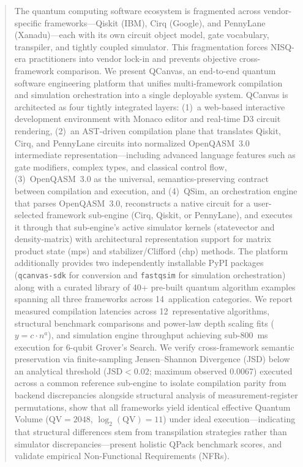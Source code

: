 \documentclass[runningheads]{llncs}
\begin{document}
\begin{abstract}
The quantum computing software ecosystem is fragmented across vendor-specific frameworks---Qiskit (IBM), Cirq (Google), and PennyLane (Xanadu)---each with its own circuit object model, gate vocabulary, transpiler, and tightly coupled simulator. This fragmentation forces NISQ-era practitioners into vendor lock-in and prevents objective cross-framework comparison. We present QCanvas, an end-to-end quantum software engineering platform that unifies multi-framework compilation and simulation orchestration into a single deployable system. QCanvas is architected as four tightly integrated layers: (1)~a web-based interactive development environment with Monaco editor and real-time D3 circuit rendering, (2)~an AST-driven compilation plane that translates Qiskit, Cirq, and PennyLane circuits into normalized OpenQASM~3.0 intermediate representation---including advanced language features such as gate modifiers, complex types, and classical control flow, (3)~OpenQASM~3.0 as the universal, semantics-preserving contract between compilation and execution, and (4)~QSim, an orchestration engine that parses OpenQASM~3.0, reconstructs a native circuit for a user-selected framework sub-engine (Cirq, Qiskit, or PennyLane), and executes it through that sub-engine's active simulator kernels (statevector and density-matrix) with architectural representation support for matrix product state (mps) and stabilizer/Clifford (chp) methods. The platform additionally provides two independently installable PyPI packages (\texttt{qcanvas-sdk} for conversion and \texttt{fastqsim} for simulation orchestration) along with a curated library of 40+ pre-built quantum algorithm examples spanning all three frameworks across 14~application categories. We report measured compilation latencies across 12~representative algorithms, structural benchmark comparisons and power-law depth scaling fits ($y = c \cdot n^a$), and simulation engine throughput achieving sub-800~ms execution for 6-qubit Grover's Search. We verify cross-framework semantic preservation via finite-sampling Jensen--Shannon Divergence (JSD) below an analytical threshold ($\text{JSD} < 0.02$; maximum observed 0.0067) executed across a common reference sub-engine to isolate compilation parity from backend discrepancies alongside structural analysis of measurement-register permutations, show that all frameworks yield identical effective Quantum Volume ($\text{QV} = 2048$, $\log_2(\text{QV}) = 11$) under ideal execution---indicating that structural differences stem from transpilation strategies rather than simulator discrepancies---present holistic QPack benchmark scores, and validate empirical Non-Functional Requirements (NFRs).

\end{abstract}
\end{document}
